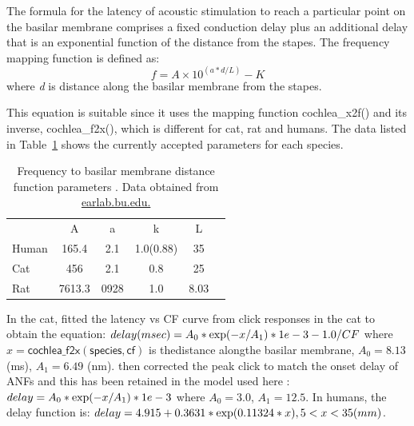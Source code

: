 The formula for the latency of acoustic stimulation to reach a particular point
on the basilar membrane comprises a fixed conduction delay plus an additional
delay that is an exponential function of the distance from the stapes. The
frequency mapping function is defined as:
\begin{equation}
  \label{eq:delay}
 f = A\times10^{\left(a*d/L\right)} - K  
\end{equation}
where \emph{d} is distance along the basilar membrane from the stapes.

\medskip{}

This equation is suitable since it uses the mapping function
\mbox{\textsf{cochlea\_x2f()}} and its inverse, \mbox{\textsf{cochlea\_f2x()}},
which is different for cat, rat and humans.  The data listed in
Table~\ref{tab:f2x} shows the currently accepted parameters for each species.


\begin{table}[h]
  \centering
  \begin{tabular}{lccccc}
\hline
      &   A   &   a  &     k     & L \\
Human & 165.4 &  2.1 & 1.0(0.88) & 35\\
 Cat  &  456  &  2.1 &    0.8    & 25 \\
 Rat  & 7613.3& 0928 &    1.0    & 8.03 \\
\hline
\end{tabular}
  \caption{Frequency to basilar membrane distance function parameters \citep{FitzGeraldBurkittEtAl:2001}. Data obtained from \url{earlab.bu.edu.}}\label{tab:f2x}
\end{table}


In the cat, \citet{CarneyYin:1988} fitted the latency vs CF curve from click
responses in the cat to obtain the equation: \( delay (msec) = A_0 * {\rm exp}(
-x / A_1 ) * 1e-3 - 1.0/CF \) where $x = \mathsf{cochlea\_f2x(species, cf)}$ is
thedistance alongthe basilar membrane, $A_0 = 8.13$ (ms), $A_1 = 6.49$
(nm). \citet{HeinzZhangEtAl:2001} then corrected the peak click to match the
onset delay of ANFs and this has been retained in the model used here
\citep{ZilanyBruceEtAl:2009}: \(delay = A_0 * {\rm exp}(-x / A_1) * 1e-3 \)
where $A_0 = 3.0$, $A_1 = 12.5$. In humans, the delay function is: \( delay =
4.915 + 0.3631 * {\rm exp}(0.11324*x) , 5<x<35 (mm) \).

\medskip{}

